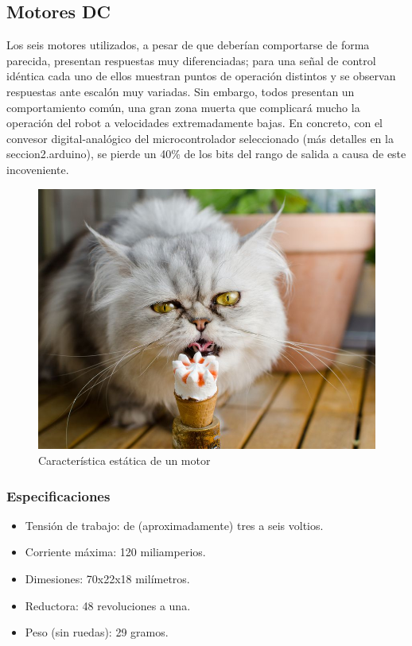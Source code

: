 \subsection{Motores DC}
 Los seis motores utilizados, a pesar de que deberían comportarse de forma parecida, presentan respuestas muy diferenciadas; para una señal de control idéntica cada uno de ellos muestran puntos de operación distintos y se observan respuestas ante escalón muy variadas. Sin embargo, todos presentan un comportamiento común, una gran zona muerta que complicará mucho la operación del robot a velocidades extremadamente bajas. En concreto, con el convesor digital-analógico del microcontrolador seleccionado (más detalles en la seccion2.arduino), se pierde un 40\% de los bits del rango de salida a causa de este incoveniente.  
 \begin{figure}[h!]
 	\centering
 	\includegraphics[width=.6\textwidth]{images/hw/motor_est}
 	\caption{Característica estática de un motor}
 \end{figure}
\subsubsection{Especificaciones}
\begin{itemize}
	\item Tensión de trabajo: de (aproximadamente) tres a seis voltios.
	\item Corriente máxima: 120 miliamperios.
	\item Dimesiones: 70x22x18 milímetros.
	\item Reductora: 48 revoluciones a una.
	\item Peso (sin ruedas): 29 gramos.
\end{itemize}
